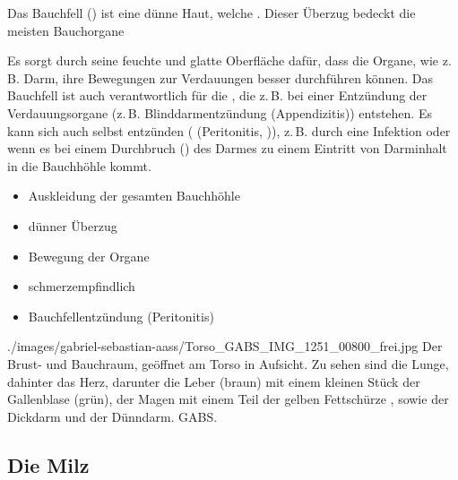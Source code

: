 {\TxBeschreibung}
{%
Das Bauchfell () ist eine dünne Haut, welche
. Dieser Überzug
bedeckt die meisten Bauchorgane 

Es sorgt durch seine feuchte und glatte Oberfläche dafür,
dass die Organe, wie z.\,B. Darm, ihre Bewegungen zur
Verdauungen besser durchführen können. Das Bauchfell ist
auch verantwortlich für die , die z.\,B. bei
einer Entzündung der Verdauungsorgane (z.\,B.
Blinddarmentzündung (Appendizitis)) entstehen. Es kann sich
auch selbst entzünden ( (Peritonitis,
)), z.\,B. durch eine
Infektion oder wenn es bei einem Durchbruch
() des Darmes zu einem Eintritt von
Darminhalt in die Bauchhöhle kommt.
}{
\begin{itemize}
    \item Auskleidung der gesamten Bauchhöhle
    \item dünner Überzug
    \item Bewegung der Organe
    \item schmerzempfindlich
    \item Bauchfellentzündung (Peritonitis)
\end{itemize}
}
{./images/gabriel-sebastian-aass/Torso_GABS_IMG_1251_00800_frei.jpg}
{Der Brust- und Bauchraum, geöffnet am Torso in Aufsicht. Zu
sehen sind die Lunge, dahinter das Herz, darunter die Leber
(braun) mit einem kleinen Stück der Gallenblase (grün), der
Magen mit einem Teil der gelben Fettschürze
, sowie der Dickdarm und
der Dünndarm. } 
{GABS.}


\subsection{Die Milz} 


